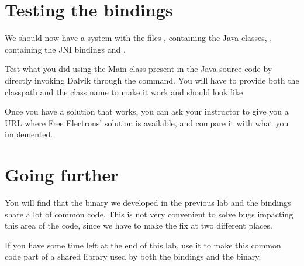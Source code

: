 \section{Testing the bindings}

We should now have a system with the files
, containing the Java
classes, , containing the JNI bindings and
.

Test what you did using the Main class present in the Java source code
by directly invoking Dalvik through the 
command. You will have to provide both the classpath and the class
name to make it work and should look like

Once you have a solution that works, you can ask your instructor to 
give you a URL where Free Electrons' solution is available, and compare
it with what you implemented.

\section{Going further}

You will find that the binary we developed in the previous lab and
the bindings share a lot of common code. This is not very convenient
to solve bugs impacting this area of the code, since we have to make
the fix at two different places.

If you have some time left at the end of this lab, use it to make this
common code part of a shared library used by both the bindings and the
binary.
